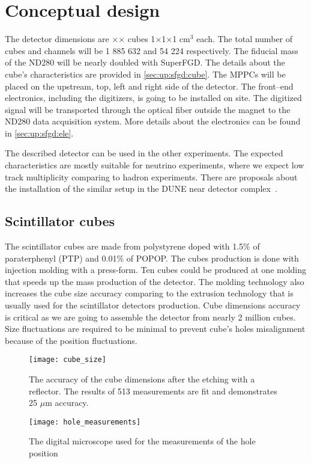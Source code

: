 \documentclass[main.tex]{subfiles}
\begin{document}
\section{Conceptual design}
The detector dimensions are \sfgdx{}$\times$\sfgdz{}$\times$\sfgdy{}  cubes 1$\times$1$\times$1 $\text{cm}^3$ each. The total number of cubes and channels will be 1 885 632 and 54 224 respectively. The fiducial mass of the ND280 will be nearly doubled with SuperFGD. The details about the cube's characteristics are provided in \autoref{sec:up:sfgd:cube}. The MPPCs will be placed on the upstream, top, left and right side of the detector. The front--end electronics, including the digitizers, is going to be installed on site. The digitized signal will be transported through the optical fiber outside the magnet to the ND280 data acquisition system. More details about the electronics can be found in \autoref{sec:up:sfgd:ele}.

The described detector can be used in the other experiments. The expected characteristics are mostly suitable for neutrino experiments, where we expect low track multiplicity comparing to hadron experiments. There are proposals about the installation of the similar setup in the DUNE near detector complex~\cite{Yang2019}.

\subsection{Scintillator cubes}
\label{sec:up:sfgd:cube}
The scintillator cubes are made from polystyrene doped with 1.5\% of paraterphenyl (PTP) and 0.01\% of POPOP. The cubes production is done with injection molding with a press-form. Ten cubes could be produced at one molding that speeds up the mass production of the detector. The molding technology also increases the cube size accuracy comparing to the extrusion technology that is usually used for the scintillator detectors production. Cube dimensions accuracy is critical as we are going to assemble the detector from nearly 2 million cubes. Size fluctuations are required to be minimal to prevent cube's holes misalignment because of the position fluctuations.

\begin{figure}[!ht]
	\centering
	\begin{minipage}{0.40\linewidth}
		\centering
		\texttt{[image: cube\_size]}
		\caption{The accuracy of the cube dimensions after the etching with a reflector. The results of 513 measurements are fit and demonstrates 25 $\mu$m accuracy.}
		\label{fig:up:sfgd:cube_s}
	\end{minipage}
	\begin{minipage}{0.19\linewidth}
	\hspace{\linewidth}
	\end{minipage}
	\begin{minipage}{0.40\linewidth}
		\centering
		\texttt{[image: hole\_measurements]}
		\caption{The digital microscope used for the measurements of the hole position}
		\label{fig:up:sfgd:hole_pos}
	\end{minipage}
\end{figure}
\end{document}
